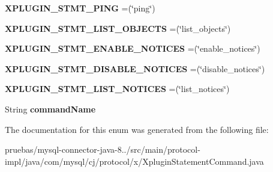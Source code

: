 \begin{DoxyCompactItemize}
\item 
\mbox{\label{enumcom_1_1mysql_1_1cj_1_1protocol_1_1x_1_1_xplugin_statement_command_a079fbb646d2173d4338b51626f35a8ec}} 
{\bfseries X\+P\+L\+U\+G\+I\+N\+\_\+\+S\+T\+M\+T\+\_\+\+P\+I\+NG} =(\char`\"{}ping\char`\"{})
\item 
\mbox{\label{enumcom_1_1mysql_1_1cj_1_1protocol_1_1x_1_1_xplugin_statement_command_a6d0e30e0cacca921202e137c43dd794c}} 
{\bfseries X\+P\+L\+U\+G\+I\+N\+\_\+\+S\+T\+M\+T\+\_\+\+L\+I\+S\+T\+\_\+\+O\+B\+J\+E\+C\+TS} =(\char`\"{}list\+\_\+objects\char`\"{})
\item 
\mbox{\label{enumcom_1_1mysql_1_1cj_1_1protocol_1_1x_1_1_xplugin_statement_command_a1ae437e3f224f097e1ac8439e42dd537}} 
{\bfseries X\+P\+L\+U\+G\+I\+N\+\_\+\+S\+T\+M\+T\+\_\+\+E\+N\+A\+B\+L\+E\+\_\+\+N\+O\+T\+I\+C\+ES} =(\char`\"{}enable\+\_\+notices\char`\"{})
\item 
\mbox{\label{enumcom_1_1mysql_1_1cj_1_1protocol_1_1x_1_1_xplugin_statement_command_a198d0cd923d70e7474030acd651fda00}} 
{\bfseries X\+P\+L\+U\+G\+I\+N\+\_\+\+S\+T\+M\+T\+\_\+\+D\+I\+S\+A\+B\+L\+E\+\_\+\+N\+O\+T\+I\+C\+ES} =(\char`\"{}disable\+\_\+notices\char`\"{})
\item 
\mbox{\label{enumcom_1_1mysql_1_1cj_1_1protocol_1_1x_1_1_xplugin_statement_command_aff5e57912e2d26c16df45d2602b3b020}} 
{\bfseries X\+P\+L\+U\+G\+I\+N\+\_\+\+S\+T\+M\+T\+\_\+\+L\+I\+S\+T\+\_\+\+N\+O\+T\+I\+C\+ES} =(\char`\"{}list\+\_\+notices\char`\"{})
\item 
\mbox{\label{enumcom_1_1mysql_1_1cj_1_1protocol_1_1x_1_1_xplugin_statement_command_ab4972dcbc9a9a14c945528a0b0cc8502}} 
String {\bfseries command\+Name}
\end{DoxyCompactItemize}


The documentation for this enum was generated from the following file\+:\begin{DoxyCompactItemize}
\item 
pruebas/mysql-\/connector-\/java-\/8../src/main/protocol-\/impl/java/com/mysql/cj/protocol/x/Xplugin\+Statement\+Command.\+java\end{DoxyCompactItemize}
